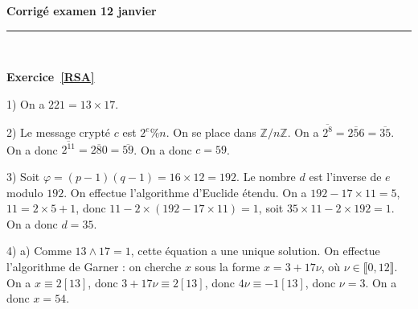 \documentclass[11pt,a4paper]{article}
\title{}
\date{}
\newcommand{\HRule}{\rule{\linewidth}{0.5mm}}
\begin{document}
\pagestyle{fancy}

\fancyhead{}
 \fancyfoot{}


\newcommand{\lb}{\llbracket}
\newcommand{\rb}{\rrbracket}
\newcommand{\N}{\mathbb{N}}
\newcommand{\Z}{\mathbb{Z}}




\newcommand{\md}[3]{#1\ \equiv \ #2 \! \! \! \! \! \pmod {#3} }
\newcommand{\nmd}[3]{#1 \not \equiv #2 \! \! \! \! \!  \pmod {#3} }
\newcommand{\mda}[3]{#1 \equiv #2 \! \!  \pmod {#3} }
\newcommand{\nmda}[3]{#1 \not \equiv #2 \! \! \pmod {#3} }
\newcommand{\mo}[2]{#1 \! \! \! \! \! \pmod #2 }
\newcommand{\moa}[2]{#1 \! \!  \pmod {#2} }

\thispagestyle{fancy}

\begin{center}
    { \huge \bfseries
Corrigé examen 12 janvier
     \\ [0cm] }
    \HRule \\[0.5cm]
\end{center}






\textbf{Exercice~\ref{RSA}}

1) On a $221=13\times 17$.

2) Le message crypté $c$ est  $2^e\%n$. On se place dans $\Z/n\Z$. On a $\overline{2^8}=\overline{256}=\overline{35}$. On a donc $\overline{2^{11}}=\overline{280}=\overline{59}$. On a donc $c=59$.

3) Soit $\varphi=(p-1)(q-1)=16\times 12=192$. Le nombre $d$ est l'inverse de $e$ modulo $192$. On effectue l'algorithme d'Euclide étendu. On a $192-17\times 11=5$, $11=2\times 5+1$, donc $11-2\times(192-17\times 11)=1$, soit $35\times 11-2\times 192=1$. On a donc $d=35$.

4) a) Comme $13\wedge 17=1$, cette équation a une unique solution. On effectue l'algorithme de Garner : on cherche $x$ sous la forme $x=3+17\nu$, où $\nu\in \llbracket 0,12\rrbracket$. On a $x\equiv 2[13]$, donc $3+17\nu\equiv 2[13]$, donc $4\nu\equiv -1[13]$, donc $\nu=3$. On a donc $x=54$. 
\end{document}
